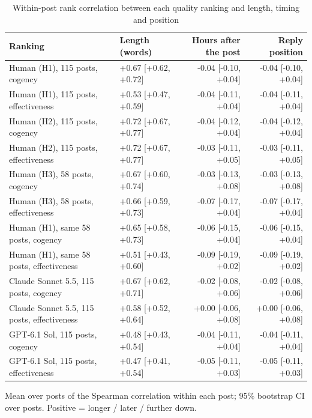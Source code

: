 \begin{table}[htbp]
\centering
\small
\caption{Within-post rank correlation between each quality ranking and length, timing and position}
\label{tab:S3_overlap_controls}
\begin{tabular}{llrr}
\toprule
Ranking & Length (words) & Hours after the post & Reply position \\
\midrule
Human (H1), 115 posts, cogency & +0.67 [+0.62, +0.72] & -0.04 [-0.10, +0.04] & -0.04 [-0.10, +0.04] \\
Human (H1), 115 posts, effectiveness & +0.53 [+0.47, +0.59] & -0.04 [-0.11, +0.04] & -0.04 [-0.11, +0.04] \\
Human (H2), 115 posts, cogency & +0.72 [+0.67, +0.77] & -0.04 [-0.12, +0.04] & -0.04 [-0.12, +0.04] \\
Human (H2), 115 posts, effectiveness & +0.72 [+0.67, +0.77] & -0.03 [-0.11, +0.05] & -0.03 [-0.11, +0.05] \\
Human (H3), 58 posts, cogency & +0.67 [+0.60, +0.74] & -0.03 [-0.13, +0.08] & -0.03 [-0.13, +0.08] \\
Human (H3), 58 posts, effectiveness & +0.66 [+0.59, +0.73] & -0.07 [-0.17, +0.04] & -0.07 [-0.17, +0.04] \\
Human (H1), same 58 posts, cogency & +0.65 [+0.58, +0.73] & -0.06 [-0.15, +0.04] & -0.06 [-0.15, +0.04] \\
Human (H1), same 58 posts, effectiveness & +0.51 [+0.43, +0.60] & -0.09 [-0.19, +0.02] & -0.09 [-0.19, +0.02] \\
Claude Sonnet 5.5, 115 posts, cogency & +0.67 [+0.62, +0.71] & -0.02 [-0.08, +0.06] & -0.02 [-0.08, +0.06] \\
Claude Sonnet 5.5, 115 posts, effectiveness & +0.58 [+0.52, +0.64] & +0.00 [-0.06, +0.08] & +0.00 [-0.06, +0.08] \\
GPT-6.1 Sol, 115 posts, cogency & +0.48 [+0.43, +0.54] & -0.04 [-0.11, +0.04] & -0.04 [-0.11, +0.04] \\
GPT-6.1 Sol, 115 posts, effectiveness & +0.47 [+0.41, +0.54] & -0.05 [-0.11, +0.03] & -0.05 [-0.11, +0.03] \\
\bottomrule
\end{tabular}
\par\vspace{2pt}\footnotesize\raggedright Mean over posts of the Spearman correlation within each post; 95\% bootstrap CI over posts. Positive = longer / later / further down.
\end{table}
